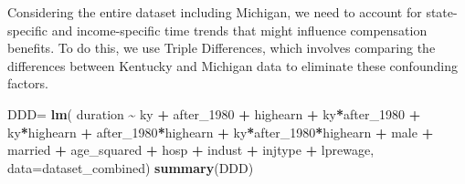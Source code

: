 \documentclass[
]{article}
\newenvironment{Shaded}{\begin{snugshade}}{\end{snugshade}}
\newcommand{\AttributeTok}[1]{\textcolor[rgb]{0.13,0.29,0.53}{#1}}
\newcommand{\FunctionTok}[1]{\textcolor[rgb]{0.13,0.29,0.53}{\textbf{#1}}}
\newcommand{\NormalTok}[1]{#1}
\newcommand{\OtherTok}[1]{\textcolor[rgb]{0.56,0.35,0.01}{#1}}
\newcommand{\SpecialCharTok}[1]{\textcolor[rgb]{0.81,0.36,0.00}{\textbf{#1}}}
\begin{document}
Considering the entire dataset including Michigan, we need to account
for state-specific and income-specific time trends that might influence
compensation benefits. To do this, we use Triple Differences, which
involves comparing the differences between Kentucky and Michigan data to
eliminate these confounding factors.

\begin{Shaded}
\begin{Highlighting}[]
\NormalTok{DDD}\OtherTok{=} \FunctionTok{lm}\NormalTok{( duration }\SpecialCharTok{\textasciitilde{}}\NormalTok{ ky }\SpecialCharTok{+}\NormalTok{ after\_1980 }\SpecialCharTok{+}\NormalTok{ highearn }\SpecialCharTok{+}\NormalTok{ ky}\SpecialCharTok{*}\NormalTok{after\_1980 }\SpecialCharTok{+}\NormalTok{ ky}\SpecialCharTok{*}\NormalTok{highearn }
         \SpecialCharTok{+}\NormalTok{ after\_1980}\SpecialCharTok{*}\NormalTok{highearn }\SpecialCharTok{+}\NormalTok{ ky}\SpecialCharTok{*}\NormalTok{after\_1980}\SpecialCharTok{*}\NormalTok{highearn }\SpecialCharTok{+}\NormalTok{ male }\SpecialCharTok{+}\NormalTok{ married }
         \SpecialCharTok{+}\NormalTok{ age\_squared }\SpecialCharTok{+}\NormalTok{ hosp }
\SpecialCharTok{+}\NormalTok{ indust }\SpecialCharTok{+}\NormalTok{ injtype }\SpecialCharTok{+}\NormalTok{ lprewage, }\AttributeTok{data=}\NormalTok{dataset\_combined)}
\FunctionTok{summary}\NormalTok{(DDD)}
\end{Highlighting}
\end{Shaded}
\end{document}
